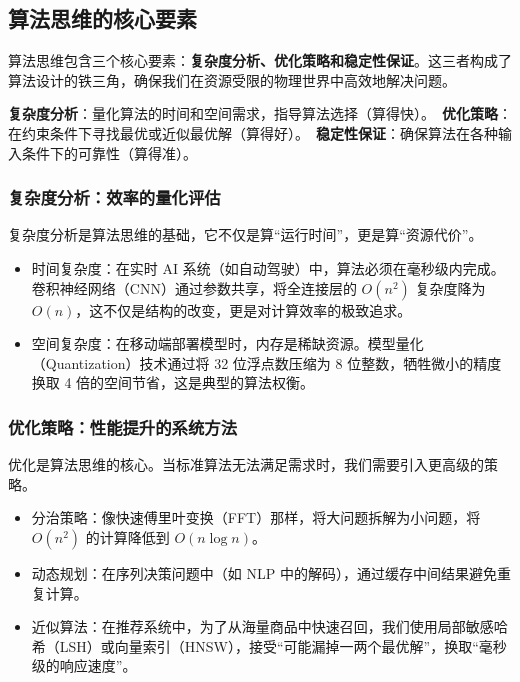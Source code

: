 \subsection{算法思维的核心要素}

算法思维包含三个核心要素：\textbf{复杂度分析、优化策略和稳定性保证}。这三者构成了算法设计的铁三角，确保我们在资源受限的物理世界中高效地解决问题。

\begin{tcolorbox} 
  \textbf{复杂度分析}：量化算法的时间和空间需求，指导算法选择（算得快）。\ 
  \textbf{优化策略}：在约束条件下寻找最优或近似最优解（算得好）。\ 
  \textbf{稳定性保证}：确保算法在各种输入条件下的可靠性（算得准）。 
\end{tcolorbox}

\subsubsection{复杂度分析：效率的量化评估}

复杂度分析是算法思维的基础，它不仅是算“运行时间”，更是算“资源代价”。
\begin{itemize}
\item 时间复杂度：在实时 AI 系统（如自动驾驶）中，算法必须在毫秒级内完成。卷积神经网络（CNN）通过参数共享，将全连接层的 $O(n^2)$ 复杂度降为 $O(n)$，这不仅是结构的改变，更是对计算效率的极致追求。
\item 空间复杂度：在移动端部署模型时，内存是稀缺资源。模型量化（Quantization）技术通过将 32 位浮点数压缩为 8 位整数，牺牲微小的精度换取 4 倍的空间节省，这是典型的算法权衡。
\end{itemize}

\subsubsection{优化策略：性能提升的系统方法}

优化是算法思维的核心。当标准算法无法满足需求时，我们需要引入更高级的策略。
\begin{itemize}
\item 分治策略：像快速傅里叶变换（FFT）那样，将大问题拆解为小问题，将 $O(n^2)$ 的计算降低到 $O(n \log n)$。
\item 动态规划：在序列决策问题中（如 NLP 中的解码），通过缓存中间结果避免重复计算。
\item 近似算法：在推荐系统中，为了从海量商品中快速召回，我们使用局部敏感哈希（LSH）或向量索引（HNSW），接受“可能漏掉一两个最优解”，换取“毫秒级的响应速度”。
\end{itemize}

